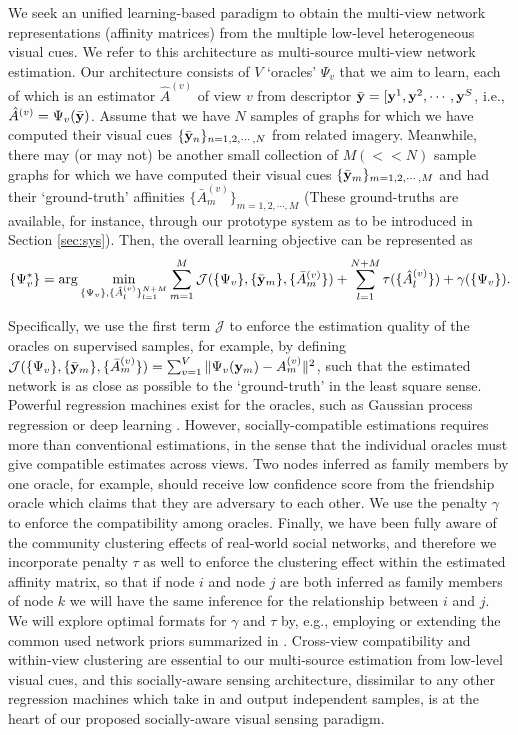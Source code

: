 We seek an unified learning-based paradigm to obtain the multi-view network representations (affinity matrices) from the multiple low-level heterogeneous visual cues. We refer to this architecture as multi-source multi-view network estimation. Our architecture consists of $V$ `oracles' $\Psi_{v}$ that we aim to learn, each of which is an estimator $\hat{A}^{(v)}$ of view $v$ from descriptor $\bar{{\bf y}}=[{\bf y}^1,{\bf y}^2, \cdots,{\bf y}^S$, i.e., $\hat{A}^{(v)}=\Psi_{v}(\bar{{\bf y}})$. Assume that we have $N$ samples of graphs for which we have computed their visual cues $\{\bar{{\bf y}}_{n}\}_{n=1,2,\cdots,N}$  from related imagery. Meanwhile, there may (or may not) be another small collection of $M(<<N)$ sample graphs for which we have computed their visual cues $\{\bar{{\bf y}}_{m}\}_{m=1,2,\cdots,M}$ and had their `ground-truth' affinities $\{\bar{A}^{(v)}_{m}\}_{m=1,2,\cdots,M}$ (These ground-truths are available, for instance, through our prototype system as to be introduced in Section \ref{sec:sys}). Then, the overall learning objective can be represented as 
\begin{equation}\label{eq:sensing}
\{\Psi^{*}_{v}\}=\arg\min_{\{\Psi_{v}\},\{\hat{A}^{(v)}_l\}_{l=1}^{N+M}}\sum_{m=1}^{M}\mathcal{J}(\{\Psi_{v}\}, \{\bar{{\bf y}}_m\}, \{\bar{A}^{(v)}_m\})+\sum_{l=1}^{N+M}\tau(\{\hat{A}^{(v)}_l\})+\gamma(\{\Psi_{v}\}).
 \end{equation}
 
Specifically, we use the first term $\mathcal{J}$ to enforce the estimation quality of the oracles on supervised samples, for example, by defining $\mathcal{J}(\{\Psi_{v}\}, \{\bar{{\bf y}}_m\}, \{\bar{A}^{(v)}_m\})=\sum_{v=1}^{V}\|\Psi_{v}({\bf y}_m)-A^{(v)}_m\|^{2}$,  such that the estimated network is as close as possible to the `ground-truth' in the least square sense. Powerful regression machines exist for the oracles, such as Gaussian process regression \cite{GPbook} or deep learning \cite{DLbook}. However, socially-compatible estimations requires more than conventional estimations, in the sense that the individual oracles must give compatible estimates across views. Two nodes inferred as family members by one oracle, for example, should receive low confidence score from the friendship oracle which claims that they are adversary to each other. We use the penalty $\gamma$ to enforce the compatibility among oracles. Finally, we have been fully aware of the community clustering effects of real-world social networks, and therefore we incorporate penalty $\tau$ as well to enforce the clustering effect within the estimated affinity matrix, so that if node $i$ and node $j$ are both inferred as family members of node $k$ we will have the same inference for the relationship between $i$ and $j$. We will explore optimal formats for $\gamma$ and $\tau$ by, e.g., employing or extending the common used network priors summarized in \cite{Goldenberg}. Cross-view compatibility and within-view clustering are essential to our multi-source estimation from low-level visual cues, and this socially-aware sensing architecture, dissimilar to any other regression machines which take in and output independent samples, is at the heart of our proposed socially-aware visual sensing paradigm.


